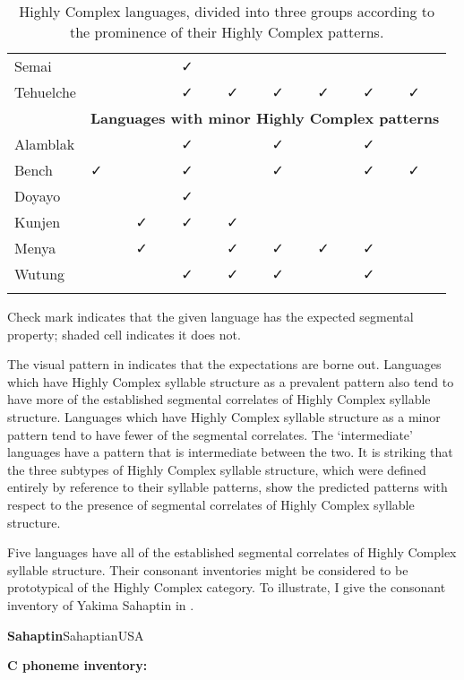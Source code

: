 \begin{table}
\begin{tabularx}{\textwidth}{XXXXXXXXX}
\hhline{~--------}
 Semai &  &  & ✓ &  &  &  &  & \\
\hhline{~--------}
 Tehuelche &  &  & ✓ & ✓ & ✓ & ✓ & ✓ & ✓\\
& \multicolumn{8}{c}{ \textbf{Languages with minor Highly Complex patterns}}\\
\hhline{~--------}
 Alamblak &  &  & ✓ &  & ✓ &  & ✓ & \\
\hhline{~--------}
 Bench & ✓ &  & ✓ &  & ✓ &  & ✓ & ✓\\
\hhline{~--------}
 Doyayo &  &  & ✓ &  &  &  &  & \\
\hhline{~--------}
 Kunjen &  & ✓ & ✓ & ✓ &  &  &  & \\
\hhline{~--------}
 Menya &  & ✓ &  & ✓ & ✓ & ✓ & ✓ & \\
\hhline{~--------}
 Wutung &  &  & ✓ & ✓ & ✓ &  & ✓ & \\
\lspbottomrule
\end{tabularx}
\caption{\label{tab:4.16}Highly Complex languages, divided into three groups according to the prominence of their Highly Complex patterns.}Check mark indicates that the given language has the expected segmental property; shaded cell indicates it does not.
\end{table}

  The visual pattern in  indicates that the expectations are borne out. Languages which have Highly Complex syllable structure as a prevalent pattern also tend to have more of the established segmental correlates of Highly Complex syllable structure. Languages which have Highly Complex syllable structure as a minor pattern tend to have fewer of the segmental correlates. The ‘intermediate’ languages have a pattern that is intermediate between the two. It is striking that the three subtypes of Highly Complex syllable structure, which were defined entirely by reference to their syllable patterns, show the predicted patterns with respect to the presence of segmental correlates of Highly Complex syllable structure.

  Five languages have all of the established segmental correlates of Highly Complex syllable structure. Their consonant inventories might be considered to be prototypical of the Highly Complex category. To illustrate, I give the consonant inventory of Yakima Sahaptin in .

\ea\label{ex:4.35}
 \textbf{Sahaptin}{Sahaptian}{USA}

\textbf{C phoneme inventory:} 

